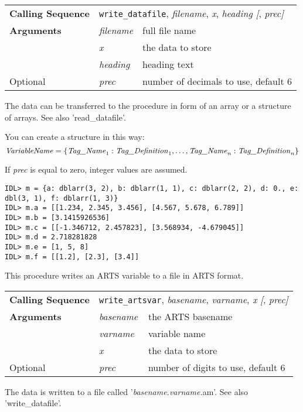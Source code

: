 \begin{center}
\begin{tabular}{|l|ll|}
  \hline
  \textbf{Calling Sequence} &
  \multicolumn{2}{l|}{\texttt{write\_datafile}, %
                      \textit{filename}, \textit{x}, %
                      \textit{heading [}, \textit{prec]}}    \\
  \textbf{Arguments} & \textit{filename} & full file name    \\
                     & \textit{x}        & the data to store \\
                     & \textit{heading}  & heading text      \\
  Optional           & \textit{prec}     &
                       number of decimals to use, default 6  \\
  \hline
\end{tabular}
\end{center}
The data can be transferred to the procedure in form of an array or a
structure of arrays. See also 'read\_datafile'.

You can create a structure in this way:
\begin{displaymath}
  \mbox{\textit{VariableName}} = 
  \{
  \mbox{\textit{Tag\_Name}}_1 : \mbox{\textit{Tag\_Definition}}_1,
  \ldots,
  \mbox{\textit{Tag\_Name}}_n : \mbox{\textit{Tag\_Definition}}_n
  \}
\end{displaymath}

If \textit{prec} is equal to zero, integer values are assumed.
\begin{verbatim}
IDL> m = {a: dblarr(3, 2), b: dblarr(1, 1), c: dblarr(2, 2), d: 0., e:
dbl(3, 1), f: dblarr(1, 3)}
IDL> m.a = [[1.234, 2.345, 3.456], [4.567, 5.678, 6.789]]
IDL> m.b = [3.1415926536]
IDL> m.c = [[-1.346712, 2.457823], [3.568934, -4.679045]]
IDL> m.d = 2.718281828
IDL> m.e = [1, 5, 8]
IDL> m.f = [[1.2], [2.3], [3.4]]
\end{verbatim}
This procedure writes an ARTS variable to a file in ARTS format.
\begin{center}
\begin{tabular}{|l|ll|}
  \hline
  \textbf{Calling Sequence} &
  \multicolumn{2}{l|}{\texttt{write\_artsvar}, %
                      \textit{basename}, \textit{varname}, %
                      \textit{x [}, \textit{prec]}}          \\
  \textbf{Arguments} & \textit{basename} & the ARTS basename \\
                     & \textit{varname}  & variable name     \\
                     & \textit{x}        & the data to store \\
  Optional           & \textit{prec}     &
                       number of digits to use, default 6    \\
  \hline
\end{tabular}
\end{center}
The data is written to a file called '\textit{basename.varname.}am'.
See also 'write\_datafile'. 


